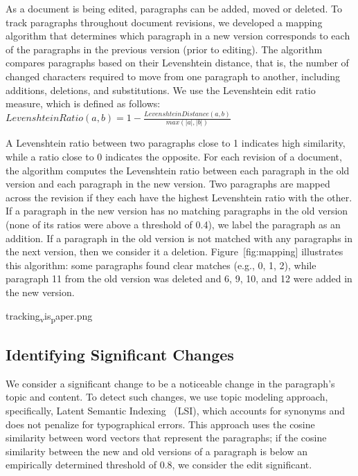 As a document is being edited, paragraphs can be added, moved or
deleted. To track paragraphs throughout document revisions, we developed
a mapping algorithm that determines which paragraph in a new version
corresponds to each of the paragraphs in the previous version (prior to
editing). The algorithm compares paragraphs based on their Levenshtein
distance, that is, the number of changed characters required to move
from one paragraph to another, including additions, deletions, and
substitutions. We use the Levenshtein edit ratio measure, which is
defined as follows:
\(Levenshtein Ratio(a,b) = 1-\frac{Levenshtein Distance(a,b)}{max(|a|,|b|)} \)

A Levenshtein ratio between two paragraphs close to 1 indicates high
similarity, while a ratio close to 0 indicates the opposite. For each
revision of a document, the algorithm computes the Levenshtein ratio
between each paragraph in the old version and each paragraph in the new
version. Two paragraphs are mapped across the revision if they each have
the highest Levenshtein ratio with the other. If a paragraph in the new
version has no matching paragraphs in the old version (none of its
ratios were above a threshold of 0.4), we label the paragraph as an
addition. If a paragraph in the old version is not matched with any
paragraphs in the next version, then we consider it a deletion.
Figure~{[}fig:mapping{]} illustrates this algorithm: some paragraphs
found clear matches (e.g., 0, 1, 2), while paragraph 11 from the old
version was deleted and 6, 9, 10, and 12 were added in the new version.

tracking\textsubscript{v}is\textsubscript{p}aper.png

\subsection{Identifying Significant
Changes}\label{identifying-significant-changes}

We consider a significant change to be a noticeable change in the
paragraph's topic and content. To detect such changes, we use topic
modeling approach, specifically, Latent Semantic
Indexing~\cite{deerwester1990indexing} (LSI), which accounts for
synonyms and does not penalize for typographical errors. This approach
uses the cosine similarity between word vectors that represent the
paragraphs; if the cosine similarity between the new and old versions of
a paragraph is below an empirically determined threshold of 0.8, we
consider the edit significant.

